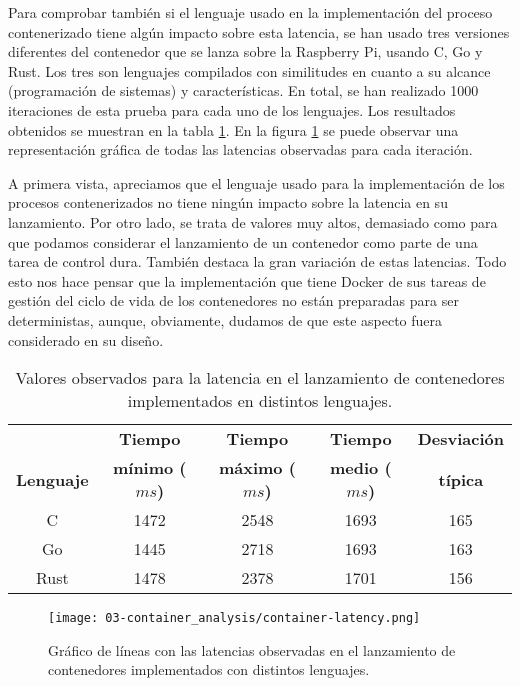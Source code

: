 Para comprobar también si el lenguaje usado en la implementación del proceso
contenerizado tiene algún impacto sobre esta latencia, se han usado tres
versiones diferentes del contenedor que se lanza sobre la Raspberry Pi, usando
C, Go y Rust. Los tres son lenguajes compilados con similitudes en cuanto a su
alcance (programación de sistemas) y características. En total, se han realizado
1000 iteraciones de esta prueba para cada uno de los lenguajes. Los resultados
obtenidos se muestran en la tabla \ref{tab:03-container_latency}. En la figura
\ref{fig:03-container_latency} se puede observar una representación gráfica de
todas las latencias observadas para cada iteración.

A primera vista, apreciamos que el lenguaje usado para la implementación de los
procesos contenerizados no tiene ningún impacto sobre la latencia en su
lanzamiento. Por otro lado, se trata de valores muy altos, demasiado como para
que podamos considerar el lanzamiento de un contenedor como parte de una tarea
de control dura. También destaca la gran variación de estas latencias. Todo esto
nos hace pensar que la implementación que tiene Docker de sus tareas de gestión
del ciclo de vida de los contenedores no están preparadas para ser
deterministas, aunque, obviamente, dudamos de que este aspecto fuera considerado
en su diseño.

\begin{table}
    \centering
    \begin{tabular}{ |c|c|c|c|c| }
        \hline
                          & \textbf{Tiempo}        & \textbf{Tiempo}        & \textbf{Tiempo}       & \textbf{Desviación} \\
        \textbf{Lenguaje} & \textbf{mínimo ($ms$)} & \textbf{máximo ($ms$)} & \textbf{medio ($ms$)} & \textbf{típica}     \\
        \hline
        C                 & 1472                   & 2548                   & 1693                  & 165                 \\
        \hline
        Go                & 1445                   & 2718                   & 1693                  & 163                 \\
        \hline
        Rust              & 1478                   & 2378                   & 1701                  & 156                 \\
        \hline
    \end{tabular}
    \caption{Valores observados para la latencia en el lanzamiento de
        contenedores implementados en distintos lenguajes.}
    \label{tab:03-container_latency}
\end{table}


\begin{figure}
    \centering
    \texttt{[image: 03-container\_analysis/container-latency.png]}
    \caption{Gráfico de líneas con las latencias observadas en el lanzamiento de
        contenedores implementados con distintos lenguajes.}
    \label{fig:03-container_latency}
\end{figure}